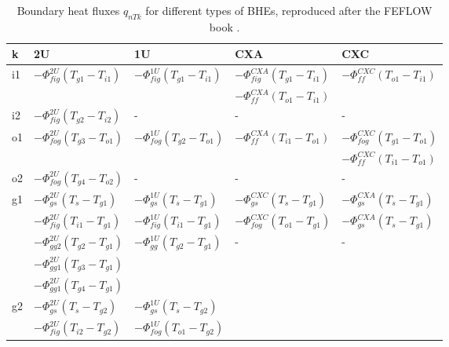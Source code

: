 \begin{table}
\centering
\caption{Boundary heat fluxes $q_{nTk}$ for different types of BHEs, reproduced after the FEFLOW book \cite{FEFLOW2014}. }
\label{tab:heat_ex_terms}
\begin{tabular}{p{1cm}p{3cm}p{3cm}p{3cm}p{3cm}}
\hline \hline
k              & 2U & 1U & CXA & CXC \\
\hline \hline
\multirow{2}{*}{i1}    & $-\Phi_{fig}^{2U}(T_{g1}-T_{i1})$ 
                       & $-\Phi_{fig}^{1U}(T_{g1}-T_{i1})$  
                       & $-\Phi_{fig}^{CXA}(T_{g1}-T_{i1})$
                       & $-\Phi_{ff}^{CXC}(T_{o1}-T_{i1})$ \\
                       & & & $-\Phi_{ff}^{CXA}(T_{o1}-T_{i1})$ & \\
\hline
i2             & $-\Phi_{fig}^{2U}(T_{g2}-T_{i2})$
               & -  & -  & - \\
\hline
\multirow{2}{*}{o1}    & $-\Phi_{fog}^{2U}(T_{g3}-T_{o1})$
                       & $-\Phi_{fog}^{1U}(T_{g2}-T_{o1})$  
                       & $-\Phi_{ff}^{CXA}(T_{i1}-T_{o1})$               
                       & $-\Phi_{fog}^{CXC}(T_{g1}-T_{o1})$ \\
                       & & & & $-\Phi_{ff}^{CXC}(T_{i1}-T_{o1})$\\
\hline
o2             & $-\Phi_{fog}^{2U}(T_{g4}-T_{o2})$
               & -  & -  & - \\
\hline
\multirow{5}{*}{g1}    & $-\Phi_{gs}^{2U}(T_{s}-T_{g1})  $ & $-\Phi_{gs}^{1U}(T_{s}-T_{g1})$     
               & $-\Phi_{gs}^{CXC}(T_{s}-T_{g1})$ & $-\Phi_{gs}^{CXA}(T_{s}-T_{g1})$ \\   
                       & $-\Phi_{fig}^{2U}(T_{i1}-T_{g1})$ & $-\Phi_{fig}^{1U}(T_{i1}-T_{g1})$  
               & $-\Phi_{fog}^{CXC}(T_{o1}-T_{g1})$ & $-\Phi_{gs}^{CXA}(T_{s}-T_{g1})$ \\
                       & $-\Phi_{gg2}^{2U}(T_{g2}-T_{g1})$ & $-\Phi_{gg}^{1U}(T_{g2}-T_{g1})$    &-&-\\
                       & $-\Phi_{gg1}^{2U}(T_{g3}-T_{g1})$ &                                     &~&~\\
                       & $-\Phi_{gg1}^{2U}(T_{g4}-T_{g1})$ &                                     &~&~\\
\hline
\multirow{5}{*}{g2}    & $-\Phi_{gs}^{2U}(T_{s}-T_{g2})$   & $-\Phi_{gs}^{1U}(T_{s}-T_{g2})$     &~&~\\ 
                       & $-\Phi_{fig}^{2U}(T_{i2}-T_{g2})$ & $-\Phi_{fog}^{1U}(T_{o1}-T_{g2})$   &~&~\\

\end{tabular}
\end{table}
